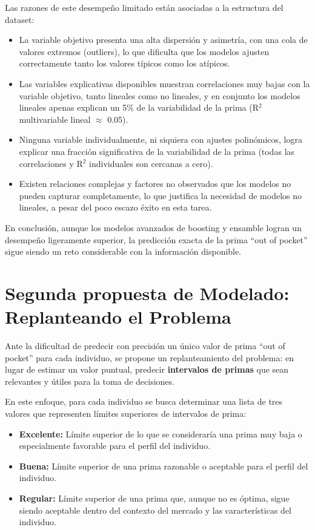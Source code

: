 \documentclass[12pt,a4paper]{article}
\begin{document}
\begin{itemize}
Las razones de este desempeño limitado están asociadas a la estructura del dataset:
\begin{itemize}
    \item La variable objetivo presenta una alta dispersión y asimetría, con una cola de valores extremos (outliers), lo que dificulta que los modelos ajusten correctamente tanto los valores típicos como los atípicos.
    \item Las variables explicativas disponibles muestran correlaciones muy bajas con la variable objetivo, tanto lineales como no lineales, y en conjunto los modelos lineales apenas explican un 5\% de la variabilidad de la prima (R$^2$ multivariable lineal $\approx$ 0.05).
    \item Ninguna variable individualmente, ni siquiera con ajustes polinómicos, logra explicar una fracción significativa de la variabilidad de la prima (todas las correlaciones y R$^2$ individuales son cercanas a cero).
    \item Existen relaciones complejas y factores no observados que los modelos no pueden capturar completamente, lo que justifica la necesidad de modelos no lineales, a pesar del poco escazo éxito en esta tarea.
\end{itemize}
En conclusión, aunque los modelos avanzados de boosting y ensamble logran un desempeño ligeramente superior, la predicción exacta de la prima ``out of pocket'' sigue siendo un reto considerable con la información disponible.


\section*{Segunda propuesta de Modelado: Replanteando el Problema}

Ante la dificultad de predecir con precisión un único valor de prima ``out of pocket'' para cada individuo, se propone un replanteamiento del problema: en lugar de estimar un valor puntual, predecir \textbf{intervalos de primas} que sean relevantes y útiles para la toma de decisiones.

En este enfoque, para cada individuo se busca determinar una lista de tres valores que representen límites superiores de intervalos de prima:
\begin{itemize}
    \item \textbf{Excelente:} Límite superior de lo que se consideraría una prima muy baja o especialmente favorable para el perfil del individuo.
    \item \textbf{Buena:} Límite superior de una prima razonable o aceptable para el perfil del individuo.
    \item \textbf{Regular:} Límite superior de una prima que, aunque no es óptima, sigue siendo aceptable dentro del contexto del mercado y las características del individuo.
\end{itemize}


\end{itemize}
\end{document}
